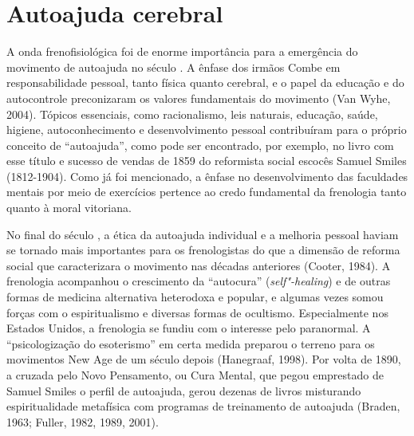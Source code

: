 \section{Autoajuda cerebral}

A onda frenofisiológica foi de enorme importância para a emergência do
movimento de autoajuda no século . A ênfase dos irmãos Combe em
responsabilidade pessoal, tanto física quanto cerebral, e o papel da
educação e do autocontrole preconizaram os valores fundamentais do
movimento (Van Wyhe, 2004). Tópicos essenciais, como racionalismo, leis
naturais, educação, saúde, higiene, autoconhecimento e desenvolvimento
pessoal contribuíram para o próprio conceito de ``autoajuda'', como pode
ser encontrado, por exemplo, no livro com esse título e sucesso de
vendas de 1859 do reformista social escocês Samuel Smiles (1812-1904).
Como já foi mencionado, a ênfase no desenvolvimento das faculdades
mentais por meio de exercícios pertence ao credo fundamental da
frenologia tanto quanto à moral vitoriana.

No final do século , a ética da autoajuda individual e a melhoria
pessoal haviam se tornado mais importantes para os frenologistas do que
a dimensão de reforma social que caracterizara o movimento nas décadas
anteriores (Cooter, 1984). A frenologia acompanhou o crescimento da
``autocura'' (\emph{self"-healing}) e de outras formas de medicina
alternativa heterodoxa e popular, e algumas vezes somou forças com o
espiritualismo e diversas formas de ocultismo. Especialmente nos Estados
Unidos, a frenologia se fundiu com o interesse pelo paranormal. A
``psicologização do esoterismo'' em certa medida preparou o terreno para
os movimentos New Age de um século depois (Hanegraaf, 1998). Por
volta de 1890, a cruzada pelo Novo Pensamento, ou Cura Mental, que pegou
emprestado de Samuel Smiles o perfil de autoajuda, gerou dezenas de
livros misturando espiritualidade metafísica com programas de
treinamento de autoajuda (Braden, 1963; Fuller, 1982, 1989, 2001).

